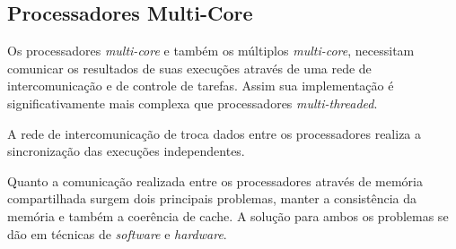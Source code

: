 \subsection{Processadores Multi-Core}

Os processadores \textit{multi-core} e também os múltiplos
\textit{multi-core}, necessitam comunicar os resultados de suas execuções
através de uma rede de intercomunicação e de controle de tarefas.
Assim sua implementação é significativamente mais complexa que processadores
\textit{multi-threaded}.

A rede de intercomunicação de troca dados entre os processadores realiza a
sincronização das execuções independentes.

Quanto a comunicação realizada entre os processadores através de memória
compartilhada surgem dois principais problemas, manter a consistência da memória
e também a coerência de cache.
A solução para ambos os problemas se dão em técnicas de \textit{software} e
\textit{hardware}.
